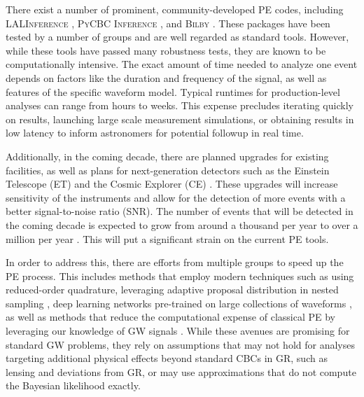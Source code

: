 \documentclass[twocolumn]{aastex631}
\newcommand{\mi}[1]{\textsf{\color{teal}[\textbf{MI:} #1]}}
\begin{document}
There exist a number of prominent, community-developed PE codes, including
\textsc{LALInference} \cite{Veitch:2014wba}, \textsc{PyCBC Inference}
\cite{Biwer:2018osg}, and \textsc{Bilby}
\cite{Ashton:2018jfp,Romero-Shaw:2020owr}.  These packages have been tested by a
number of groups and are well regarded as standard tools. However, while these
tools have passed many robustness tests, they are known to be computationally
intensive. The exact amount of time needed to analyze one event depends on
factors like the duration and frequency of the signal, as well as features of
the specific waveform model. Typical runtimes for production-level analyses can
range from hours to weeks. This expense precludes iterating quickly on results,
launching large scale measurement simulations, or obtaining results in low
latency to inform astronomers for potential followup in real time.

Additionally, in the coming decade, there are planned upgrades for existing
facilities, as well as plans for next-generation detectors such as the Einstein
Telescope (ET) \cite{Punturo:2010zz} and the Cosmic Explorer (CE)
\cite{LIGOScientific:2016wof}. These upgrades will increase sensitivity of
the instruments and allow for the detection of more events with a better
signal-to-noise ratio (SNR). The number of events that will be detected in the
coming decade is expected to grow from around a thousand per year to over a
million per year \cite{Baibhav:2019gxm}. This will put a significant strain on
the current PE tools.

In order to address this, there are efforts from multiple groups to speed up the
PE process. This includes methods that employ modern techniques such as
using reduced-order quadrature\cite{Canizares:2014fya,Smith:2016qas}, leveraging adaptive proposal distribution in nested sampling
\cite{Williams:2021qyt}, deep learning networks pre-trained on large collections
of waveforms \cite{Dax:2021tsq,Dax:2022pxd}, as well as methods that reduce the
computational expense of classical PE by leveraging our knowledge of GW signals
\cite{Veitch:2014wba,Ashton:2021anp,Islam:2022afg,Roulet:2022kot,Lee:2022jpn,Lange:2018pyp,Wofford:2022ykb}.
While these avenues are promising for standard GW problems, they rely on
assumptions that may not hold for analyses targeting additional physical effects
beyond standard CBCs in GR, such as lensing and deviations from GR, or may use
approximations that do not compute the Bayesian likelihood exactly.
\end{document}
